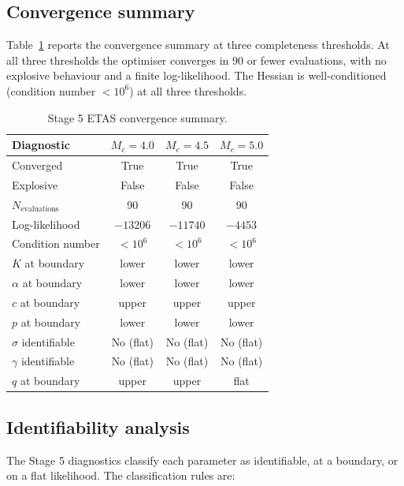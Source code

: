 \documentclass[10pt,a4paper,twocolumn]{article}
\begin{document}
\subsection{Convergence summary}

Table~\ref{tab:stage5-convergence} reports the convergence summary at three completeness thresholds. At all three thresholds the optimiser converges in 90 or fewer evaluations, with no explosive behaviour and a finite log-likelihood. The Hessian is well-conditioned (condition number $< 10^6$) at all three thresholds.

\begin{table}[t]
\centering
\caption{Stage 5 ETAS convergence summary.}\label{tab:stage5-convergence}
\small
\begin{tabular*}{\columnwidth}{@{\extracolsep{\fill}}lccc}
\toprule
Diagnostic & $M_c=4.0$ & $M_c=4.5$ & $M_c=5.0$ \\
\midrule
Converged            & True & True & True \\
Explosive            & False & False & False \\
$N_{\text{evaluations}}$ & 90 & 90 & 90 \\
Log-likelihood       & $-13206$ & $-11740$ & $-4453$ \\
Condition number     & $<10^6$ & $<10^6$ & $<10^6$ \\
$K$ at boundary      & lower & lower & lower \\
$\alpha$ at boundary & lower & lower & lower \\
$c$ at boundary      & upper & upper & upper \\
$p$ at boundary      & lower & lower & lower \\
$\sigma$ identifiable & No (flat) & No (flat) & No (flat) \\
$\gamma$ identifiable & No (flat) & No (flat) & No (flat) \\
$q$ at boundary      & upper & upper & flat \\
\bottomrule
\end{tabular*}
\end{table}

\subsection{Identifiability analysis}

The Stage 5 diagnostics classify each parameter as identifiable, at a boundary, or on a flat likelihood. The classification rules are:
\end{document}
